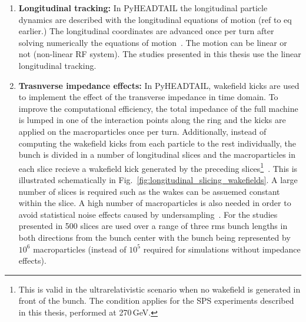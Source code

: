 {{\begin{enumerate}
\begin{equation}
        \Delta \mu_{x, i \mathrm{IP0 \to IP1 }} = \Delta \mu_{x, \mathrm{IP0 \to IP1 }} + (\xi^{1}_x \delta_i + \alpha_{xx}J_{x, i} + \alpha_{xy}J_{y,i}) \frac{\Delta \mu_{x, \mathrm{IP0 \to IP1 }}}{2\pi Q_x}, 
    \end{equation}
    where $i=1, ..., N$ with N being the number of macroparticles, $\Delta \mu_{x, \mathrm{IP0 \to IP1 }}$ is the phase advance for all macroparticles defined in the previous step, $\xi_x^{1}$ the horizontal chromaticity of first order normalised to the tune $\alpha_{xx}$ and $\alpha_{xy}$ are the detuning coefficients, while $J_x$ and $J_y$ are the horizontal and vertical actions of the macroparticle. Therefore, in the presence of detuning the elements of the $M$ matrix are different for every particle.

    \item \textbf{Longitudinal tracking:}  In PyHEADTAIL the longitudinal particle dynamics are described with the longitudinal equations of motion (ref to eq earlier.) %
    The longitudinal coordinates are advanced once per turn after solving numerically the equations of motion~\cite{pyheadtail_schenk}. The motion can be linear or not (non-linear RF system). The studies presented in this thesis use the linear longitudinal tracking.

    \item \textbf{Trasnverse impedance effects:} In PyHEADTAIL, wakefield kicks are used to implement the effect of the transverse impedance in time domain. To improve the computational efficiency, the total impedance of the full machine is lumped in one of the interaction points along the ring and the kicks are applied on the macroparticles once per turn. Additionally, instead of computing the wakefield kicks from each particle to the rest individually, the bunch is divided in a number of longitudinal slices and the macroparticles in each slice recieve a wakefield kick generated by the preceding slices\footnote{This is valid in the ultrarelativistic scenario when no wakefield is generated in front of the bunch. The condition applies for the SPS experiments described in this thesis, performed at 270\,GeV.}~\cite{Salvant:1274254}. This is illustrated schematically in Fig.~\ref{fig:longitudinal_slicing_wakefields}. A large number of slices is required such as the wakes can be assuemed constant within the slice. A high number of macroparticles is also needed in order to avoid statistical noise effects caused by undersampling~\cite{pyheadtail_manual_adrian}. For the studies presented in 500 slices are used over a range of three rms bunch lengths in both directions from the bunch center with the bunch being represented by $10^6$ macroparticles (instead of $10^5$ required for simulations without impedance effects).
    


\end{enumerate}}}
